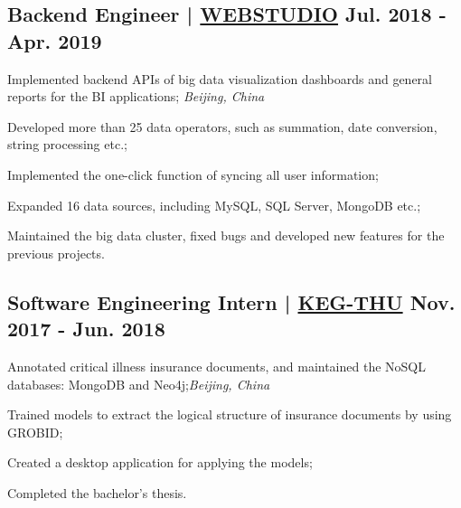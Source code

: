 \subsection{{Backend Engineer | \href{http://www.wbdatavis.com/}{WEBSTUDIO} \hfill Jul. 2018 - Apr. 2019}}
\begin{zitemize}
    \item Implemented backend APIs of big data visualization dashboards and general reports for the BI applications; \hfill \textit{Beijing, China}
    \item Developed more than 25 data operators, such as summation, date conversion, string processing etc.;
    \item Implemented the one-click function of syncing all user information;
    \item Expanded 16 data sources, including MySQL, SQL Server, MongoDB etc.;
    \item Maintained the big data cluster, fixed bugs and developed new features for the previous projects.
\end{zitemize}

\subsection{{Software Engineering Intern | \href{https://keg.cs.tsinghua.edu.cn/}{KEG-THU} \hfill Nov. 2017 - Jun. 2018}}

\begin{zitemize}
    \item Annotated critical illness insurance documents, and maintained the NoSQL databases: MongoDB and Neo4j;\hfill \textit{Beijing, China}
    \item Trained models to extract the logical structure of insurance documents by using GROBID;
    \item Created a desktop application for applying the models;
    \item Completed the bachelor's thesis.
\end{zitemize}

